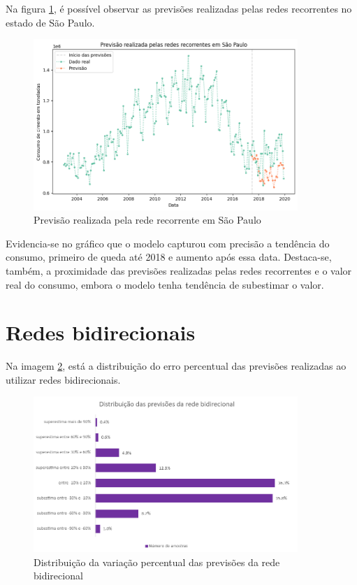 Na figura \ref{img:consumo-sp-rnn}, é possível observar as previsões realizadas pelas 
redes recorrentes no estado de São Paulo.

\begin{figure}[H]
    \centering
    \includegraphics[width=10cm]{../figuras/graficos/rnn/prev_sp.png}
    \caption{Previsão realizada pela rede recorrente em São Paulo}
    \label{img:consumo-sp-rnn}
\end{figure}

Evidencia-se no gráfico que o modelo capturou com precisão a tendência do 
consumo, primeiro de queda até 2018 e aumento após essa data. Destaca-se, 
também, a proximidade das previsões realizadas pelas redes recorrentes e o 
valor real do consumo, embora o modelo tenha tendência de subestimar o valor.


\section{Redes bidirecionais}

Na imagem \ref{img:erro-perc-bnn}, está a distribuição do erro percentual das 
previsões realizadas ao utilizar redes bidirecionais. 

\begin{figure}[H] 
    \centering
    \includegraphics[width=10cm]{../figuras/graficos/bi/erro-perc-bi.png}
    \caption{Distribuição da variação percentual das previsões da rede bidirecional}
    \label{img:erro-perc-bnn}
\end{figure}


